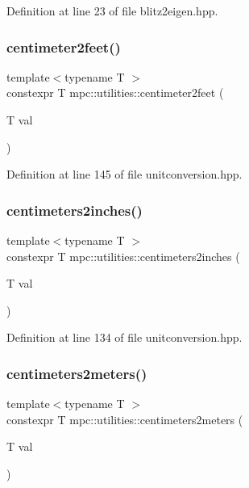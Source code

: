 Definition at line 23 of file blitz2eigen.\+hpp.

\mbox{\label{namespacempc_1_1utilities_ab344f73d9ed97735b823ecf6569355b1}} 
\subsubsection{\texorpdfstring{centimeter2feet()}{centimeter2feet()}}
{\footnotesize\ttfamily template$<$typename T $>$ \\
constexpr T mpc\+::utilities\+::centimeter2feet (\begin{DoxyParamCaption}\item[{T}]{val }\end{DoxyParamCaption})}



Definition at line 145 of file unitconversion.\+hpp.

\mbox{\label{namespacempc_1_1utilities_a8852f021788cc48d045e975e16c0382f}} 
\subsubsection{\texorpdfstring{centimeters2inches()}{centimeters2inches()}}
{\footnotesize\ttfamily template$<$typename T $>$ \\
constexpr T mpc\+::utilities\+::centimeters2inches (\begin{DoxyParamCaption}\item[{T}]{val }\end{DoxyParamCaption})}



Definition at line 134 of file unitconversion.\+hpp.

\mbox{\label{namespacempc_1_1utilities_a736267b7c5d34ebf9dbfd75e9b4ceccd}} 
\subsubsection{\texorpdfstring{centimeters2meters()}{centimeters2meters()}}
{\footnotesize\ttfamily template$<$typename T $>$ \\
constexpr T mpc\+::utilities\+::centimeters2meters (\begin{DoxyParamCaption}\item[{T}]{val }\end{DoxyParamCaption})}



